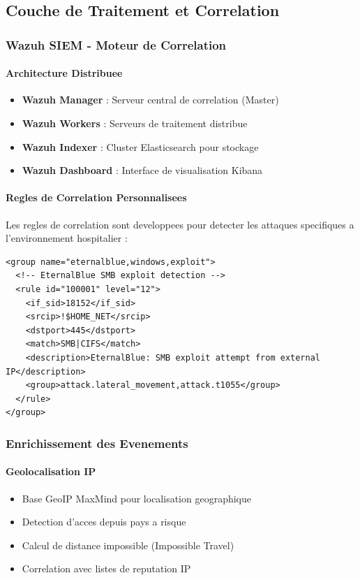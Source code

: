 \subsection{Couche de Traitement et Correlation}

\subsubsection{Wazuh SIEM - Moteur de Correlation}

\paragraph{Architecture Distribuee}
\begin{itemize}
    \item \textbf{Wazuh Manager} : Serveur central de correlation (Master)
    \item \textbf{Wazuh Workers} : Serveurs de traitement distribue
    \item \textbf{Wazuh Indexer} : Cluster Elasticsearch pour stockage
    \item \textbf{Wazuh Dashboard} : Interface de visualisation Kibana
\end{itemize}

\paragraph{Regles de Correlation Personnalisees}

Les regles de correlation sont developpees pour detecter les attaques specifiques a l'environnement hospitalier :

\begin{lstlisting}[style=xmlstyle,caption=Exemple de regle Wazuh pour detection EternalBlue]
<group name="eternalblue,windows,exploit">
  <!-- EternalBlue SMB exploit detection -->
  <rule id="100001" level="12">
    <if_sid>18152</if_sid>
    <srcip>!$HOME_NET</srcip>
    <dstport>445</dstport>
    <match>SMB|CIFS</match>
    <description>EternalBlue: SMB exploit attempt from external IP</description>
    <group>attack.lateral_movement,attack.t1055</group>
  </rule>
</group>
\end{lstlisting}

\subsubsection{Enrichissement des Evenements}

\paragraph{Geolocalisation IP}
\begin{itemize}
    \item Base GeoIP MaxMind pour localisation geographique
    \item Detection d'acces depuis pays a risque
    \item Calcul de distance impossible (Impossible Travel)
    \item Correlation avec listes de reputation IP
\end{itemize}



